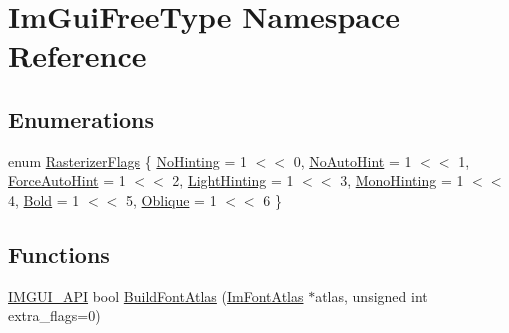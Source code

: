 \hypertarget{namespace_im_gui_free_type}{}\section{Im\+Gui\+Free\+Type Namespace Reference}
\label{namespace_im_gui_free_type}
\subsection*{Enumerations}
\begin{DoxyCompactItemize}
\item 
enum \mbox{\hyperlink{namespace_im_gui_free_type_a2f8e91ffa41706b44072258dcff5696f}{Rasterizer\+Flags}} \{ \newline
\mbox{\hyperlink{namespace_im_gui_free_type_a2f8e91ffa41706b44072258dcff5696face7188583b9431ddd892d1342e9f39fd}{No\+Hinting}} = 1 $<$$<$ 0, 
\mbox{\hyperlink{namespace_im_gui_free_type_a2f8e91ffa41706b44072258dcff5696fa6a22d496715b6af4de4a8426c2504b69}{No\+Auto\+Hint}} = 1 $<$$<$ 1, 
\mbox{\hyperlink{namespace_im_gui_free_type_a2f8e91ffa41706b44072258dcff5696fa58d19a4ea34bc6d9b4a9cd62772eb60f}{Force\+Auto\+Hint}} = 1 $<$$<$ 2, 
\mbox{\hyperlink{namespace_im_gui_free_type_a2f8e91ffa41706b44072258dcff5696fab3a834eea17bd33d049455419c13ad12}{Light\+Hinting}} = 1 $<$$<$ 3, 
\newline
\mbox{\hyperlink{namespace_im_gui_free_type_a2f8e91ffa41706b44072258dcff5696fa72df44b235579eb99d1d318ae26d5dba}{Mono\+Hinting}} = 1 $<$$<$ 4, 
\mbox{\hyperlink{namespace_im_gui_free_type_a2f8e91ffa41706b44072258dcff5696fac371423e8763e294ce6c16f4bdb9e878}{Bold}} = 1 $<$$<$ 5, 
\mbox{\hyperlink{namespace_im_gui_free_type_a2f8e91ffa41706b44072258dcff5696fa47d65041189aa56535c93e54745868af}{Oblique}} = 1 $<$$<$ 6
 \}
\end{DoxyCompactItemize}
\subsection*{Functions}
\begin{DoxyCompactItemize}
\item 
\mbox{\hyperlink{imgui_8h_a43829975e84e45d1149597467a14bbf5}{I\+M\+G\+U\+I\+\_\+\+A\+PI}} bool \mbox{\hyperlink{namespace_im_gui_free_type_acb5c34ce2486d90e3afe7944664cc677}{Build\+Font\+Atlas}} (\mbox{\hyperlink{struct_im_font_atlas}{Im\+Font\+Atlas}} $\ast$atlas, unsigned int extra\+\_\+flags=0)
\end{DoxyCompactItemize}


